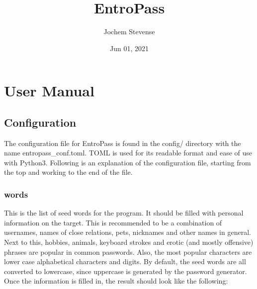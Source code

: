 \documentclass[letterpaper,10pt,english]{sphinxmanual}
\title{EntroPass}
\date{Jun 01, 2021}
\author{Jochem Stevense}
\begin{document}
\pagestyle{empty}
\sphinxmaketitle
\pagestyle{plain}
\sphinxtableofcontents
\pagestyle{normal}
\label{\detokenize{index::doc}}



\chapter{User Manual}
\label{\detokenize{usage:user-manual}}\label{\detokenize{usage::doc}}

\section{Configuration}
\label{\detokenize{usage:configuration}}
\sphinxAtStartPar
The configuration file for EntroPass is found in the config/ directory with the name entropass\_conf.toml. TOML is used for its readable format and ease of use with Python3. Following is an explanation of the configuration file, starting from the top and working to the end of the file.


\subsection{words}
\label{\detokenize{usage:words}}

\begin{fulllineitems}
\label{\detokenize{usage:list}}
\sphinxAtStartPar
This is the list of seed words for the program. It should be filled with personal information on the target. This is recommended to be a combination of usernames, names of close relations, pets, nicknames and other names in general. Next to this, hobbies, animals, keyboard strokes and erotic (and mostly offensive) phrases are popular in common passwords. Also, the most popular characters are lower case alphabetical characters and digits. By default, the seed words are all converted to lowercase, since uppercase is generated by the password generator. Once the information is filled in, the result should look like the following:

\begin{sphinxVerbatim}[commandchars=\\\{\}]
\PYG{p}{[}\PYG{p}{]}
  \PYG{p}{[}
 \PYG{p}{]}
\end{sphinxVerbatim}

\end{fulllineitems}
\end{document}
